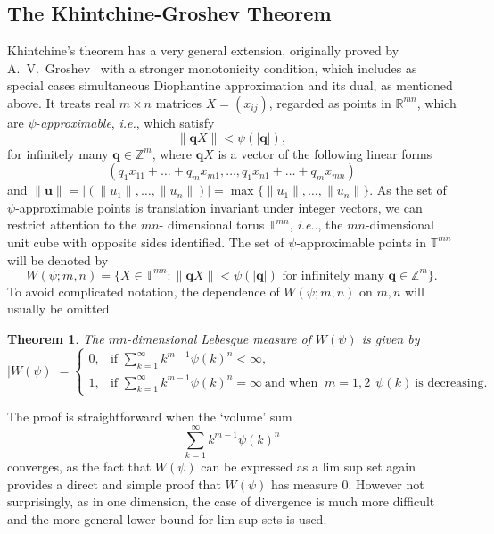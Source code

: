 \documentclass[reqno]{amsart}
\newtheorem{thm}{Theorem}
\newcommand{\R}{{\mathbb{R}}}
\newcommand{\T}{{\mathbb{T}}}
\newcommand{\Z}{{\mathbb{Z}}}
\newcommand{\0}{{\mathbf{0}}}
\newcommand{\q}{{\mathbf{q}}}
\newcommand{\ub}{\mathbf{u}}
\newcommand{\ie}{{\it{i.e.}}}
\newcommand{\K}{Khintchine}
\begin{document}
\subsection{The \K-Groshev Theorem}
\label{subsec:KG}
\K's theorem has a very general extension, originally proved by
A.~V.~Groshev~\cite{Sprindzuk} with a stronger monotonicity condition,
which includes as special cases simultaneous Diophantine approximation
and its dual, as mentioned above.  It treats real $m \times n$
matrices $X=(x_{ij})$, regarded as points in $\R^{mn}$, which are
$\psi$-{\it{approximable}}, \ie, which satisfy
\begin{equation}
  \label{eq:3}
\| \q X \| < \psi(|\q|),   
\end{equation}
for infinitely many $\q \in \Z^m$, where $\q X$ is a vector of the
following linear forms 
$$
(q_1x_{11} + \dots + q_m x_{m1}, \dots,q_1
x_{n1} + \dots + q_m x_{mn})
$$ 
and $\| \ub \|= |(\|u_1\|,\dots,\|u_n\|)|=
\max\{\|u_1\|,\dots,\|u_n\|\}$.  As the set of $\psi$-approximable
points is translation invariant under integer vectors, we can restrict
attention to the $mn$- dimensional torus $\T^{mn}$, \ie., the
$mn$-dimensional unit cube with opposite sides identified. The set of
$\psi$-approximable points in $\T^{mn}$ will be denoted by
\begin{equation*}
W(\psi;m,n) = \{X\in \T^{mn}:\|\q X \| < \psi(|\q|) {\text { for
    infinitely many }} \q \in \Z^m \}.  
\end{equation*}
To avoid complicated notation, the dependence of $W(\psi;m,n)$ on $m,n$
will usually be omitted.  
\begin{thm} 
  The $mn$-dimensional Lebesgue measure of $W(\psi)$ is given by
 \begin{equation*}
    |W(\psi)| = \begin{cases} 0, 
      &\text{if } \sum_{k=1}^\infty k^{m-1}\psi(k)^n<\infty, \\
      1,
      &\text{if }  \sum_{k=1}^\infty k^{m-1}\psi(k)^n=\infty 
      \ \text{and when } \ m=1,2 \ \ \psi(k) \ \text{is decreasing}.
                  \end{cases}
  \end{equation*}
\end{thm}
The proof is straightforward when the `volume' sum 
\begin{equation}
  \label{eq:volsum}
\sum_{k=1}^\infty  k^{m-1}\psi(k)^n
\end{equation}
converges, as the fact that $W(\psi)$ can be expressed as a lim sup
set again provides a direct and simple proof that $W(\psi)$ has
measure $0$.  However not surprisingly, as in one dimension, the
case of divergence is much more difficult and the more general
lower bound for lim sup sets is used. 
\end{document}
